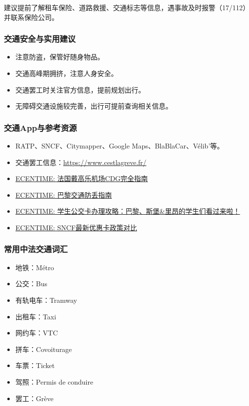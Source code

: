 建议提前了解租车保险、道路救援、交通标志等信息，遇事故及时报警（17/112）并联系保险公司。

\subsubsection{交通安全与实用建议}
\begin{itemize}
    \item 注意防盗，保管好随身物品。
    \item 交通高峰期拥挤，注意人身安全。
    \item 交通罢工时关注官方信息，提前规划出行。
    \item 无障碍交通设施较完善，出行可提前查询相关信息。
\end{itemize}

\subsubsection{交通App与参考资源}
\begin{itemize}
    \item RATP、SNCF、Citymapper、Google Maps、BlaBlaCar、Vélib’等。
    \item 交通罢工信息：\url{https://www.cestlagreve.fr/}
    \item \href{https://www.ecentime.com/article/aeroport-CDG%202020}{ECENTIME: 法国戴高乐机场CDG完全指南}
    \item \href{https://www.ecentime.com/article/transport-paris}{ECENTIME: 巴黎交通防丢指南}
    \item \href{https://www.ecentime.com/article/reduction-transport-etudiant}{ECENTIME: 学生公交卡办理攻略：巴黎、斯堡\&里昂的学生们看过来啦！}
    \item \href{https://www.ecentime.com/article/ecentime-sncf-reduction}{ECENTIME: SNCF最新优惠卡政策对比}
\end{itemize}

\subsubsection{常用中法交通词汇}
\begin{itemize}
    \item 地铁：Métro
    \item 公交：Bus
    \item 有轨电车：Tramway
    \item 出租车：Taxi
    \item 网约车：VTC
    \item 拼车：Covoiturage
    \item 车票：Ticket
    \item 驾照：Permis de conduire
    \item 罢工：Grève
\end{itemize}
